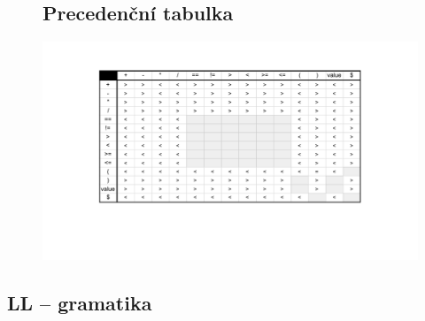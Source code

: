 \documentclass[a4paper, 12pt]{article}
\def\fillandplacepagenumber{%
 \par\pagestyle{empty}%
 \vbox to 0pt{\vss}\vfill
 \vbox to 0pt{\baselineskip0pt
   \hbox to\linewidth{\hss}%
   \baselineskip\footskip
   \hbox to\linewidth{%
     \hfil\thepage\hfil}\vss}}
\begin{document}
\begin{landscape}
\pagestyle{empty}
\begin{figure}[h]
\subsection{Precedenční tabulka}
\hspace*{-3.6cm}\vspace*{+1cm}\includegraphics[width=1.85\textwidth,keepaspectratio]{Precedence_table.pdf}
\end{figure}
\end{landscape}

\newpage

\subsection{LL -- gramatika}
\end{document}
